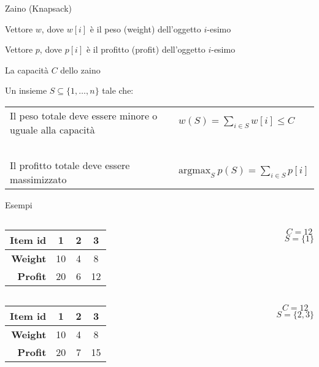 \begin{frame}{Zaino (Knapsack)}

\vspace{-9pt}
\begin{myboxtitle}[Input]
\BIL
\item Vettore $w$, dove \alert{$w[i]$} è il \alert{peso} (\alert{weight}) dell'oggetto $i$-esimo
\item Vettore $p$, dove \alert{$p[i]$} è il \alert{profitto} (\alert{profit}) dell'oggetto $i$-esimo
\item La \alert{capacità} $C$ dello zaino
\EIL
\end{myboxtitle}

\begin{myboxtitle}[Output]
Un insieme $S \subseteq \{1, \ldots, n\}$ tale che:

\medskip
\begin{tabular}{P{5cm}P{5cm}}
Il \alert{peso totale} deve essere minore o uguale alla capacità &

$w(S) = \sum_{i \in S} w[i] \leq C$
\\
~\\
Il \alert{profitto totale} deve essere massimizzato &
$
\textrm{argmax}_S \ p(S) = \sum_{i \in S} p[i]
$
\\
\end{tabular}
\end{myboxtitle}

\end{frame}

\begin{frame}{Esempi}

\vspace{-9pt}

\begin{columns}[T]
\begin{tabular}{|r|c|c|c|}
\hline
\textbf{Item id} & \textbf{1} & \textbf{2} & \textbf{3} \\\hline
\textbf{Weight} & 10 & 4 & 8 \\\hline
\textbf{Profit} & 20 & 6 & 12 \\\hline 
\end{tabular} 
\[C=12\]
\pause
{}
\[S = \{1 \}\]
\end{columns}

\smallskip
{}

\pause
\smallskip
{}

\begin{columns}[T]
\begin{tabular}{|r|c|c|c|}
\hline
\textbf{Item id} & \textbf{1} & \textbf{2} & \textbf{3} \\\hline
\textbf{Weight} & 10 & 4 & 8 \\\hline
\textbf{Profit} & 20 & 7 & 15 \\\hline 
\end{tabular}
\[C=12\]
\pause
{}
\[S = \{ 2,3 \}\]
\end{columns}
\end{frame}

